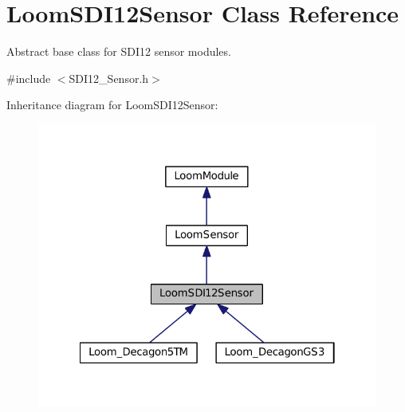 \hypertarget{class_loom_s_d_i12_sensor}{}\section{Loom\+S\+D\+I12\+Sensor Class Reference}
\label{class_loom_s_d_i12_sensor}


Abstract base class for S\+D\+I12 sensor modules.  




{\ttfamily \#include $<$S\+D\+I12\+\_\+\+Sensor.\+h$>$}



Inheritance diagram for Loom\+S\+D\+I12\+Sensor\+:\nopagebreak
\begin{figure}[H]
\begin{center}
\leavevmode
\includegraphics[width=322pt]{class_loom_s_d_i12_sensor__inherit__graph}
\end{center}
\end{figure}
